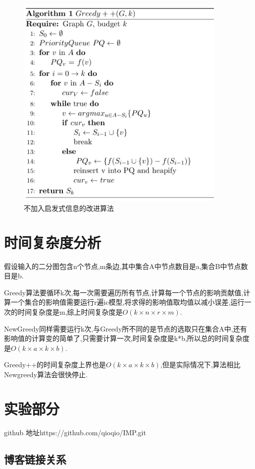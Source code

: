\documentclass[11pt, a4paper]{article}
\begin{document}
  \begin{figure}[H]
    \centering\includegraphics[width=4in]{images/greedypp.png}
    \caption{不加入启发式信息的改进算法}\label{fig:greedypp}
  \end{figure}

  \section{时间复杂度分析}

  假设输入的二分图包含n个节点,m条边,其中集合A中节点数目是a,集合B中节点数目是b.

  Greedy算法要循环k次,每一次需要遍历所有节点,计算每一个节点的影响贡献值,计算一个集合的影响值需要运行r遍ic模型,将求得的影响值取均值以减小误差,运行一次的时间复杂度是m,综上时间复杂度是$O(k\times n\times r\times m)$.

  NewGreedy同样需要运行k次,与Greedy所不同的是节点的选取只在集合A中,还有影响值的计算变的简单了,只需要计算一次,时间复杂度是k*b,所以总的时间复杂度是$O(k\times a\times k\times b)$.

  Greedy++的时间复杂度上界也是$O(k\times a\times k\times b)$,但是实际情况下,算法相比Newgreedy算法会很快停止.

  \section{实验部分}

  github 地址https://github.com/qioqio/IMP.git

  \subsection{博客链接关系}
\end{document}
